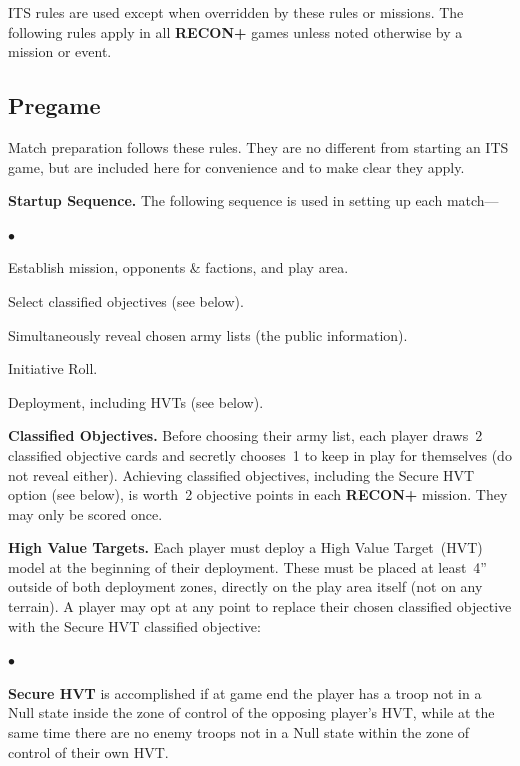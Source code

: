 \documentclass[14pt,dvipsnames]{extarticle}
\newcommand{\missionrule}[1]{\noindent\textbf{#1}\xspace}
\newenvironment{squishitemize}
{\begin{list}{$\bullet$}{%
    \setlength{\itemsep}{2pt}%
    \setlength{\parsep}{2pt}%
    \setlength{\topsep}{2pt}%
    \setlength{\parskip}{0pt} %
    \renewcommand{\labelitemi}{--}}}
  {\end{list}}
\newcommand{\reconplus}{\textbf{RECON+}\xspace}
\begin{document}
ITS rules are used except when overridden by these rules or missions.
The following rules apply in all \reconplus games unless noted
otherwise by a mission or event.

\subsection{Pregame}

Match preparation follows these rules.  They are no different from
starting an ITS game, but are included here for convenience and to
make clear they apply.

\missionrule{Startup Sequence.}  The following sequence is used in
setting up each match---

\begin{squishitemize}  
\item Establish mission, opponents \& factions, and play area.

\item Select classified objectives (see below).
  
\item Simultaneously reveal chosen army lists (the public information).

\item Initiative Roll.

\item Deployment, including HVTs (see below).
\end{squishitemize}

\missionrule{Classified Objectives.}  Before choosing their army list,
each player draws~2 classified objective cards and secretly chooses~1
to keep in play for themselves (do not reveal either).  Achieving
classified objectives, including the Secure HVT option (see below), is
worth~2 objective points in each \reconplus mission.  They may only be
scored once.

\missionrule{High Value Targets.}  Each player must deploy a High
Value Target~(HVT) model at the beginning of their deployment.  These
must be placed at least~4'' outside of both deployment zones, directly
on the play area itself (not on any terrain).  A player may opt at any
point to replace their chosen classified objective with the Secure HVT
classified objective:

\begin{squishitemize}
\item \textbf{Secure HVT} is accomplished if at game end the player
  has a troop not in a Null state inside the zone of control of the
  opposing player's HVT, while at the same time there are no enemy
  troops not in a Null state within the zone of control of their own
  HVT.
\end{squishitemize}
\end{document}
